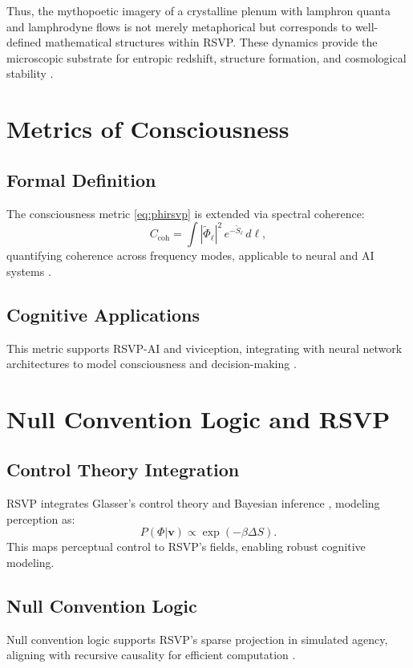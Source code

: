 \documentclass[12pt]{report}
\newcommand{\PhiRSVP}{\Phi}
\newcommand{\vRSVP}{\mathbf{v}}
\newcommand{\SRSVP}{S}
\begin{document}
Thus, the mythopoetic imagery of a crystalline plenum with lamphron quanta and lamphrodyne flows is not merely metaphorical but corresponds to well-defined mathematical structures within RSVP. These dynamics provide the microscopic substrate for entropic redshift, structure formation, and cosmological stability \citep{RSVPMeta2025}.


\chapter{Metrics of Consciousness}
\label{app:M}
\section{Formal Definition}
The consciousness metric \eqref{eq:phirsvp} is extended via spectral coherence:
\begin{equation}
C_{\text{coh}} = \int |\tilde{\PhiRSVP}_\ell|^2 \, e^{-\tilde{\SRSVP}_\ell} \, d\ell,
\end{equation}
quantifying coherence across frequency modes, applicable to neural and AI systems \citep{Tononi2016}.

\section{Cognitive Applications}
This metric supports RSVP-AI and viviception, integrating with neural network architectures to model consciousness and decision-making \citep{RSVPMeta2025}.

\chapter{Null Convention Logic and RSVP}
\label{app:N}
\section{Control Theory Integration}
RSVP integrates Glasser’s control theory \citep{Glasser1985} and Bayesian inference \citep{Friston2010}, modeling perception as:
\begin{equation}
P(\PhiRSVP | \vRSVP) \propto \exp\left(-\beta \Delta \SRSVP\right).
\end{equation}
This maps perceptual control to RSVP’s fields, enabling robust cognitive modeling.

\section{Null Convention Logic}
Null convention logic \citep{Fant1998} supports RSVP’s sparse projection in simulated agency, aligning with recursive causality for efficient computation \citep{RSVPMeta2025}.
\end{document}
